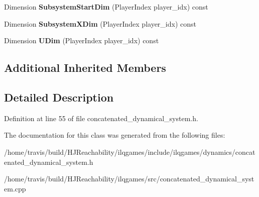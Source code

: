 \begin{DoxyCompactItemize}
\item 
Dimension {\bfseries Subsystem\+Start\+Dim} (Player\+Index player\+\_\+idx) const \hypertarget{classilqgames_1_1_concatenated_dynamical_system_a14a0206022b433d335fb70fcf9e5ac85}{}\label{classilqgames_1_1_concatenated_dynamical_system_a14a0206022b433d335fb70fcf9e5ac85}

\item 
Dimension {\bfseries Subsystem\+X\+Dim} (Player\+Index player\+\_\+idx) const \hypertarget{classilqgames_1_1_concatenated_dynamical_system_a8a41a816bf3320cd6d78548beac02d80}{}\label{classilqgames_1_1_concatenated_dynamical_system_a8a41a816bf3320cd6d78548beac02d80}

\item 
Dimension {\bfseries U\+Dim} (Player\+Index player\+\_\+idx) const \hypertarget{classilqgames_1_1_concatenated_dynamical_system_a99e27c1644875b924741e037bcb54460}{}\label{classilqgames_1_1_concatenated_dynamical_system_a99e27c1644875b924741e037bcb54460}

\end{DoxyCompactItemize}
\subsection*{Additional Inherited Members}


\subsection{Detailed Description}


Definition at line 55 of file concatenated\+\_\+dynamical\+\_\+system.\+h.



The documentation for this class was generated from the following files\+:\begin{DoxyCompactItemize}
\item 
/home/travis/build/\+H\+J\+Reachability/ilqgames/include/ilqgames/dynamics/concatenated\+\_\+dynamical\+\_\+system.\+h\item 
/home/travis/build/\+H\+J\+Reachability/ilqgames/src/concatenated\+\_\+dynamical\+\_\+system.\+cpp\end{DoxyCompactItemize}
